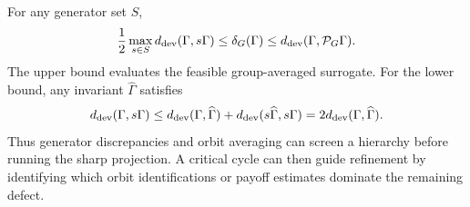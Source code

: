 For any generator set $S$,
\begin{equation}
\frac12\max_{s\in S}d_{\mathrm{dev}}(\Gamma,s\Gamma)
\le
\delta_G(\Gamma)
\le
d_{\mathrm{dev}}(\Gamma,\mathcal P_G\Gamma).
\label{eq:supp-screening}
\end{equation}
The upper bound evaluates the feasible group-averaged surrogate.  For the lower bound, any invariant $\widehat\Gamma$ satisfies
\[
d_{\mathrm{dev}}(\Gamma,s\Gamma)
\le
d_{\mathrm{dev}}(\Gamma,\widehat\Gamma)
+
d_{\mathrm{dev}}(s\widehat\Gamma,s\Gamma)
=
2d_{\mathrm{dev}}(\Gamma,\widehat\Gamma).
\]
Thus generator discrepancies and orbit averaging can screen a hierarchy before running the sharp projection.  A critical cycle can then guide refinement by identifying which orbit identifications or payoff estimates dominate the remaining defect.
